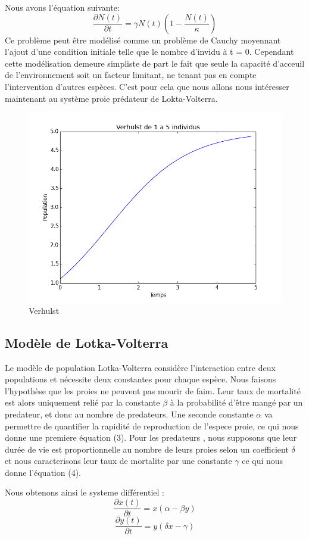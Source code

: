Nous avons l'équation suivante:
\begin{equation}
\frac{\partial N(t)}{\partial t} = \gamma N(t)(1 - \frac{N(t)}{\kappa})
\end{equation}
 Ce problème peut être modélisé comme un problème de Cauchy moyennant l'ajout d'une condition initiale telle que le nombre d'invidu à t = 0.
 Cependant cette modélisation demeure simpliste de part le fait que seule la capacité d'acceuil de l'environnement soit un facteur limitant, ne tenant pas en compte l'intervention d'autres espèces. C'est pour cela que nous allons nous intéresser maintenant au système proie prédateur de Lokta-Volterra.
 
\begin{figure}
\centering
\includegraphics[width=.3\textwidth]{verhulst}

\caption{Verhulst}
\label{fig:verhulst}
\end{figure}
 
\subsection{Modèle de Lotka-Volterra}


Le modèle de population Lotka-Volterra considère l'interaction entre deux populations et nécessite deux constantes pour chaque espèce. Nous faisons l'hypothèse que les proies ne peuvent pas mourir de faim. Leur taux de mortalité est alors uniquement relié par la constante $\beta$ à la probabilité d'être mangé par un predateur, et donc au nombre de predateurs.
Une seconde constante  $\alpha$ va permettre de quantifier la rapidité de reproduction de l'espece proie, ce qui nous donne une premiere équation (3). Pour les predateurs , nous supposons que leur durée de vie est proportionnelle au nombre de leurs proies selon un coefficient  $\delta$ et nous caracterisons leur taux de mortalite par une constante $\gamma$
ce qui nous donne l'équation (4).

Nous obtenons ainsi le systeme différentiel :
\begin{equation}
\frac{\partial x(t)}{\partial t} = x(\alpha - \beta y)
\end{equation}
\begin{equation}
\frac{\partial y(t)}{\partial t} = y(\delta x - \gamma)
\end{equation}

